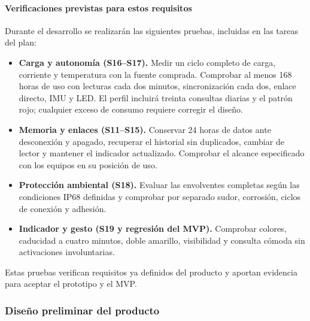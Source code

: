 \paragraph{Verificaciones previstas para estos requisitos}
Durante el desarrollo se realizarán las siguientes pruebas, incluidas en las tareas del plan:
\begin{itemize}
\item \textbf{Carga y autonomía (S16--S17).} Medir un ciclo completo de carga, corriente y temperatura con la fuente comprada. Comprobar al menos 168 horas de uso con lecturas cada dos minutos, sincronización cada dos, enlace directo, IMU y LED. El perfil incluirá treinta consultas diarias y el patrón rojo; cualquier exceso de consumo requiere corregir el diseño.
\item \textbf{Memoria y enlaces (S11--S15).} Conservar 24 horas de datos ante desconexión y apagado, recuperar el historial sin duplicados, cambiar de lector y mantener el indicador actualizado. Comprobar el alcance especificado con los equipos en su posición de uso.
\item \textbf{Protección ambiental (S18).} Evaluar las envolventes completas según las condiciones IP68 definidas y comprobar por separado sudor, corrosión, ciclos de conexión y adhesión.
\item \textbf{Indicador y gesto (S19 y regresión del MVP).} Comprobar colores, caducidad a cuatro minutos, doble amarillo, visibilidad y consulta cómoda sin activaciones involuntarias.
\end{itemize}
Estas pruebas verifican requisitos ya definidos del producto y aportan evidencia para aceptar el prototipo y el MVP.


\subsubsection{Diseño preliminar del producto}




